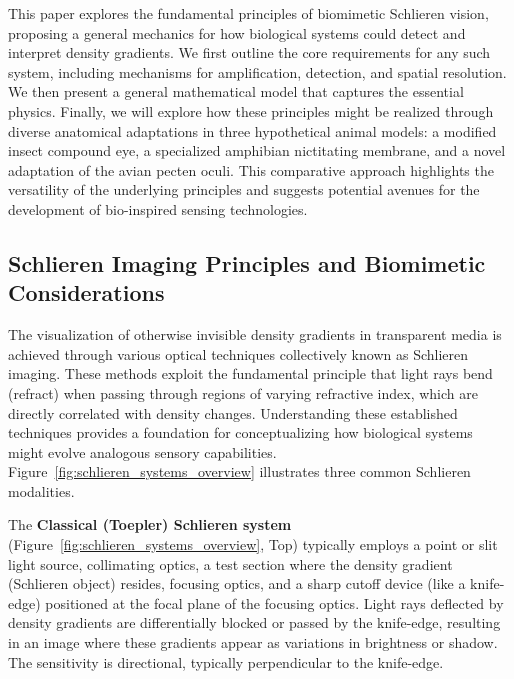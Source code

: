 \documentclass[11pt]{article}
\begin{document}
This paper explores the fundamental principles of biomimetic Schlieren vision, proposing a general mechanics for how biological systems could detect and interpret density gradients. We first outline the core requirements for any such system, including mechanisms for amplification, detection, and spatial resolution. We then present a general mathematical model that captures the essential physics. Finally, we will explore how these principles might be realized through diverse anatomical adaptations in three hypothetical animal models: a modified insect compound eye, a specialized amphibian nictitating membrane, and a novel adaptation of the avian pecten oculi. This comparative approach highlights the versatility of the underlying principles and suggests potential avenues for the development of bio-inspired sensing technologies.

\subsection{Schlieren Imaging Principles and Biomimetic Considerations}
\label{sec:schlieren_principles_biomimetic}

The visualization of otherwise invisible density gradients in transparent media is achieved through various optical techniques collectively known as Schlieren imaging. These methods exploit the fundamental principle that light rays bend (refract) when passing through regions of varying refractive index, which are directly correlated with density changes. Understanding these established techniques provides a foundation for conceptualizing how biological systems might evolve analogous sensory capabilities. Figure~\ref{fig:schlieren_systems_overview} illustrates three common Schlieren modalities.


The \textbf{Classical (Toepler) Schlieren system} (Figure~\ref{fig:schlieren_systems_overview}, Top) \cite{Settles2001Schlieren} typically employs a point or slit light source, collimating optics, a test section where the density gradient (Schlieren object) resides, focusing optics, and a sharp cutoff device (like a knife-edge) positioned at the focal plane of the focusing optics. Light rays deflected by density gradients are differentially blocked or passed by the knife-edge, resulting in an image where these gradients appear as variations in brightness or shadow. The sensitivity is directional, typically perpendicular to the knife-edge.
\end{document}
